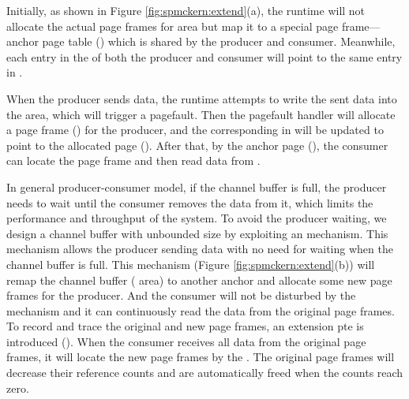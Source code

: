 Initially, as shown in Figure \ref{fig:spmckern:extend}(a), the runtime will not allocate the actual page frames for  area but map it to a special page frame--- anchor page table () which is shared by the producer and consumer.
Meanwhile, each entry in the  of both the producer and consumer will  point to the same entry in . 

When the producer sends data, the runtime attempts to write the sent data into the  area, which will trigger a pagefault. 
Then the pagefault handler will allocate a page frame () for the producer, and the corresponding  in  will be updated to point to the allocated page (). 
After that, by the anchor page (), the consumer can locate the page frame   and then read data from .


In general producer-consumer model, if the channel buffer is full, the producer needs to wait until the consumer removes the data from it, which limits the performance and throughput of the system.
To avoid the producer waiting, we design a channel buffer with unbounded size  by exploiting an  mechanism\cite{}.
This mechanism allows the producer sending data with no need for waiting when the channel buffer is full.
This  mechanism (Figure  \ref{fig:spmckern:extend}(b)) will remap the channel buffer ( area) to another anchor and allocate some new page frames for the producer. 
And the consumer will not be disturbed by the  mechanism and it can continuously read the data from the original page frames.
To record and trace the original  and  new page frames, an extension pte is introduced ().
When the consumer receives all data from the original page frames, it will locate the new page frames by the .
The original page frames will decrease their reference counts and are automatically freed  when the counts reach zero.


